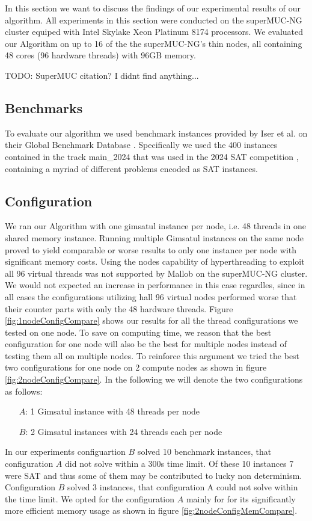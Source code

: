 \documentclass[12pt,a4paper,twoside]{scrartcl}
\numberwithin{equation}{section}
\begin{document}
In this section we want to discuss the findings of our experimental results of our algorithm. All experiments in this section were conducted on the superMUC-NG cluster equiped with Intel Skylake Xeon Platinum 8174 processors. We evaluated our Algorithm on up to 16 of the the superMUC-NG's thin nodes, all containing 48 cores (96 hardware threads) with 96GB memory.

TODO: SuperMUC citation? I didnt find anything...

\subsection{Benchmarks}
To evaluate our algorithm we used benchmark instances provided by Iser et al. on their Global Benchmark Database \cite{benchmarkDB}. Specifically we used the 400 instances contained in the track main\_2024 that was used in the 2024 SAT competition \cite{satComp2024}, containing a myriad of different problems encoded as SAT instances.

\subsection{Configuration}
We ran our Algorithm with one gimsatul instance per node, i.e. 48 threads in one shared memory instance. Running multiple Gimsatul instances on the same node proved to yield comparable or worse results to only one instance per node with significant memory costs. Using the nodes capability of hyperthreading to exploit all 96 virtual threads was not supported by Mallob on the superMUC-NG cluster. We would not expected an increase in performance in this case regardles, since in all cases the configurations utilizing hall 96 virtual nodes performed worse that their counter parts with only the 48 hardware threads. Figure \ref{fig:1nodeConfigCompare} shows our results for all the thread configurations we tested on one node. To save on computing time, we reason that the best configuration for one node will also be the best for multiple nodes instead of testing them all on multiple nodes. To reinforce this argument we tried the best two configurations for one node on 2 compute nodes as shown in figure \ref{fig:2nodeConfigCompare}. In the following we will denote the two configurations as follows:
\begin{itemize}
  \item[$A$:] 1 Gimsatul instance with 48 threads per node
  \item[$B$:] 2 Gimsatul instances with 24 threads each per node
\end{itemize}
In our experiments configuartion $B$ solved 10 benchmark instances, that configuration $A$ did not solve within a 300s time limit. Of these 10 instances 7 were SAT and thus some of them may be contributed to lucky non determinism. Configuration $B$ solved 3 instances, that configuration A could not solve within the time limit. We opted for the configuration $A$ mainly for for its significantly more efficient memory usage as shown in figure \ref{fig:2nodeConfigMemCompare}.
\end{document}

